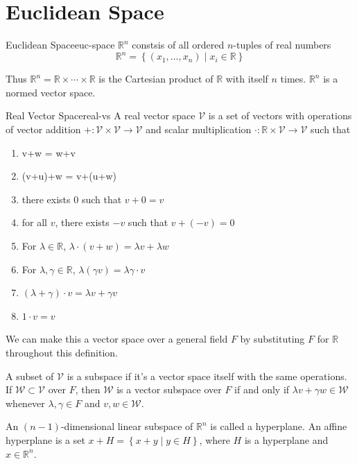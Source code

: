 \documentclass[10pt]{report}
\begin{document}

\section{Euclidean Space}

\begin{defn}{Euclidean Space}{euc-space}
	$\mathbb{R}^n$ constsis of all ordered $n$-tuples of real numbers
	\[
		\mathbb{R}^n = \left\{ (x_1,\dots,x_n) \;|\; x_i \in \mathbb{R} \right\}
	\] 
\end{defn}

Thus $\mathbb{R}^n = \mathbb{R} \times \cdots \times \mathbb{R}$ is the Cartesian product of $\mathbb{R}$ with itself $n$ times. $\mathbb{R}^n$ is a normed vector space.

\begin{defn}{Real Vector Space}{real-vs}
	A real vector space $\mathcal{V}$ is a set of vectors with operations of vector addition $+:\mathcal{V} \times \mathcal{V} \to \mathcal{V}$ and scalar multiplication $\cdot : \mathbb{R} \times \mathcal{V} \to \mathcal{V}$ such that
	\begin{enumerate}
		\item v+w = w+v
		\item (v+u)+w = v+(u+w)
		\item there exists 0 such that $v+0=v$ 
		\item for all $v$, there exists $-v$ such that $v+(-v)=0$ 
		\item For $ \lambda \in \mathbb{R}$, $\lambda \cdot (v+w) = \lambda v + \lambda w$ 
		\item For $\lambda, \gamma \in \mathbb{R}$, $\lambda (\gamma v) = \lambda \gamma \cdot v$
		\item $(\lambda + \gamma) \cdot v = \lambda v + \gamma v$
		 \item $1 \cdot v = v$
	\end{enumerate}
\end{defn}
We can make this a vector space over a general field $F$ by substituting $F$ for $\mathbb{R}$ throughout this definition.

A subset of $\mathcal{V}$ is a subspace if it's a vector space itself with the same operations. If $\mathcal{W} \subset \mathcal{V}$ over $F$, then $\mathcal{W}$ is a vector subspace over $F$ if and only if $\lambda v + \gamma w \in \mathcal{W}$ whenever $\lambda,\gamma \in F$ and $v,w \in \mathcal{W}$.

An $(n-1)$-dimensional linear subspace of $\mathbb{R}^n$ is called a hyperplane. An affine hyperplane is a set $x+H = \left\{ x+y \;|\; y\in H \right\}$, where $H$ is a hyperplane and $x \in \mathbb{R}^n$.
\end{document}
